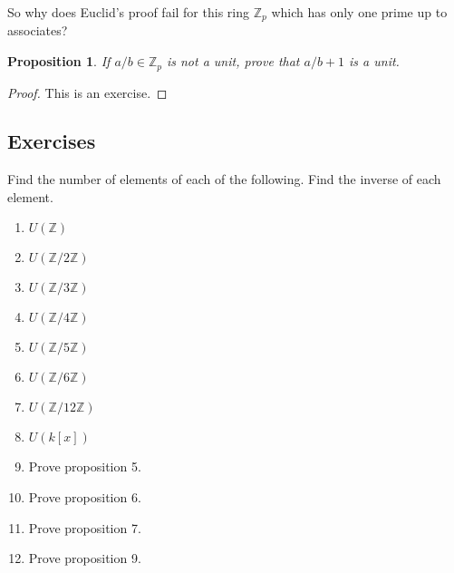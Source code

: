 \documentclass{article}
\theoremstyle{problemstyle}
\newtheorem{proposition}{Proposition}
\begin{document}
So why does Euclid's proof fail for this ring $\mathbb{Z}_p$ which has only one prime up to associates? 

\begin{proposition}
If $a/b \in \mathbb{Z}_p$ is not a unit, prove that $a/b + 1$ is a unit. 
\end{proposition}

\begin{proof}
This is an exercise. 
\end{proof}

\subsection*{Exercises}

Find the number of elements of each of the following. Find the inverse of each element. 
\begin{enumerate}
\item $U(\mathbb{Z})$
\item $U(\mathbb{Z}/2\mathbb{Z})$
\item $U(\mathbb{Z}/3\mathbb{Z})$
\item $U(\mathbb{Z}/4\mathbb{Z})$
\item $U(\mathbb{Z}/5\mathbb{Z})$
\item $U(\mathbb{Z}/6\mathbb{Z})$
\item $U(\mathbb{Z}/12\mathbb{Z})$
\item $U(k[x])$
\item Prove proposition 5. 
\item Prove proposition 6. 
\item Prove proposition 7. 
\item Prove proposition 9. 
\end{enumerate}
\end{document}
